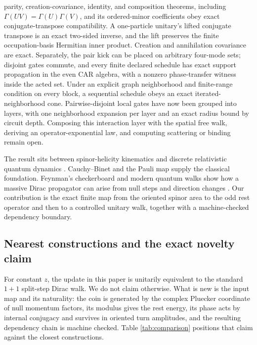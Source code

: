 \documentclass[11pt]{article}
\begin{document}
\begin{enumerate}[leftmargin=2em]
  parity, creation-covariance, identity, and composition theorems, including
  $\Gamma(UV)=\Gamma(U)\Gamma(V)$, and its ordered-minor coefficients obey
  exact conjugate-transpose compatibility.  A one-particle unitary's lifted
  conjugate transpose is an exact two-sided inverse, and the lift preserves
  the finite occupation-basis Hermitian inner product.  Creation and
  annihilation covariance are exact.  Separately, the pair kick can be placed
  on arbitrary four-mode sets; disjoint gates commute, and every finite
  declared schedule has exact support propagation in the even CAR algebra,
  with a nonzero phase-transfer witness inside the acted set.  Under an explicit
  graph neighborhood and finite-range condition on every block, a sequential
  schedule obeys an exact iterated-neighborhood cone.  Pairwise-disjoint local
  gates have now been grouped into layers, with one neighborhood expansion per
  layer and an exact radius bound by circuit depth.  Composing this
  interaction layer with the spatial free walk, deriving an
  operator-exponential law, and computing scattering or binding remain open.
\end{enumerate}

The result sits between spinor-helicity kinematics and discrete relativistic
quantum dynamics \cite{ElvangHuang,ArkaniHamedMassive}.  Cauchy--Binet and the
Pauli map supply the classical foundation.  Feynman's checkerboard and modern
quantum walks show how a massive Dirac propagator can arise from null steps and
direction changes
\cite{FeynmanHibbs,JacobsonSchulman,BisioDarianoTosini,DarianoPathIntegral,MlodinowBrun}.
Our contribution is the exact finite map from the oriented spinor area to the
odd rest operator and then to a controlled unitary walk, together with a
machine-checked dependency boundary.

\subsection*{Nearest constructions and the exact novelty claim}

For constant $z$, the update in this paper is unitarily equivalent to the
standard $1+1$ split-step Dirac walk.  We do not claim otherwise.  What is new
is the input map and its naturality: the coin is generated by the complex
Pluecker coordinate of null momentum factors, its modulus gives the rest
energy, its phase acts by internal conjugacy and survives in oriented turn
amplitudes, and the resulting dependency chain is machine checked.  Table
\ref{tab:comparison} positions that claim against the closest constructions.
\end{document}
